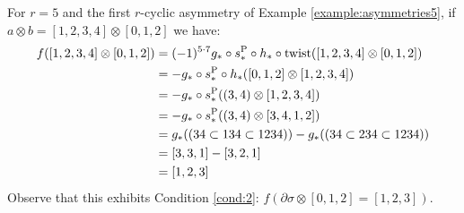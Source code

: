 \begin{example}\label{example:f5_2}
	For $r=5$ and the first $r$-cyclic asymmetry of Example \ref{example:asymmetries5}, if $a\otimes b = [1,2,3,4]\otimes [0,1,2]$ we have:
\begin{align*}
	f([1,2,3,4]\otimes [0,1,2]) &= (-1)^{5\cdot 7}g_*\circ s_*^{\operatorname{P}}\circ h_*\circ \operatorname{twist}([1,2,3,4]\otimes [0,1,2]) 
	\\
	&= -g_*\circ s_*^{\operatorname{P}}\circ h_*([0,1,2]\otimes [1,2,3,4])
	\\
	&= -g_*\circ s_*^{\operatorname{P}}((3,4)\otimes [1,2,3,4])
	\\
	&= -g_*\circ s_*^{\operatorname{P}}((3,4)\otimes [3,4,1,2])
	\\
	&= g_*((34\subset 134\subset 1234)) - g_*((34\subset 234\subset 1234))
	\\
	&= [3,3,1] - [3,2,1]
	\\
	&= [1,2,3]
	\end{align*}
	Observe that this exhibits Condition \eqref{cond:2}: $f(\partial\sigma \otimes [0,1,2] = [1,2,3])$.
\end{example}

